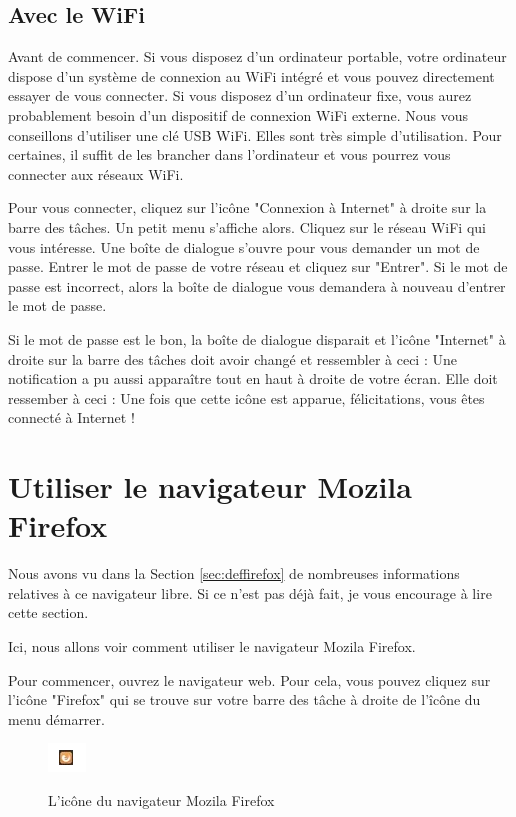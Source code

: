\documentclass[12pt]{book}
\begin{document}
	\subsection{Avec le WiFi}
		Avant de commencer.
		Si vous disposez d'un ordinateur portable, votre ordinateur dispose d'un système de connexion au WiFi intégré et vous pouvez directement essayer de vous connecter.
		Si vous disposez d'un ordinateur fixe, vous aurez probablement besoin d'un dispositif de connexion WiFi externe.
		Nous vous conseillons d'utiliser une clé USB WiFi.
		Elles sont très simple d'utilisation.
		Pour certaines, il suffit de les brancher dans l'ordinateur et vous pourrez vous connecter aux réseaux WiFi.\par
		Pour vous connecter, cliquez sur l'icône "Connexion à Internet" à droite sur la barre des tâches.
		Un petit menu s'affiche alors.
		Cliquez sur le réseau WiFi qui vous intéresse.
		Une boîte de dialogue s'ouvre pour vous demander un mot de passe.
		Entrer le mot de passe de votre réseau et cliquez sur "Entrer".
		Si le mot de passe est incorrect, alors la boîte de dialogue vous demandera à nouveau d'entrer le mot de passe.\par
		Si le mot de passe est le bon, la boîte de dialogue disparait et l'icône "Internet" à droite sur la barre des tâches doit avoir changé et ressembler à ceci :
		Une notification a pu aussi apparaître tout en haut à droite de votre écran.
		Elle doit ressember à ceci :
		Une fois que cette icône est apparue, félicitations, vous êtes connecté à Internet !
\section{Utiliser le navigateur Mozila Firefox}\label{sec:utiliserfirefox}
	Nous avons vu dans la Section \ref{sec:deffirefox} de nombreuses informations relatives à ce navigateur libre.
	Si ce n'est pas déjà fait, je vous encourage à lire cette section.\par
	Ici, nous allons voir comment utiliser le navigateur Mozila Firefox.\par
	Pour commencer, ouvrez le navigateur web.
	Pour cela, vous pouvez cliquez sur l'icône "Firefox" qui se trouve sur votre barre des tâche à droite de l'îcône du menu démarrer.
	\begin{figure}[h]
		\includegraphics{include/icn_firefox.png}
		\label{fig:iconefirefox}
		\caption{L'icône du navigateur Mozila Firefox}
	\end{figure}\par
\end{document}
